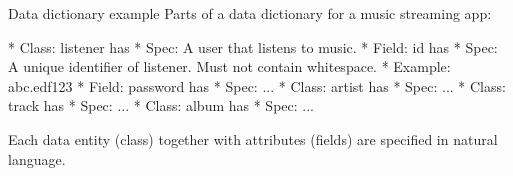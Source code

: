 \begin{Slide}{Data dictionary example}
Parts of a data dictionary for a music streaming app:
\begin{Code}[language=reqt]
* Class: listener has
  * Spec: A user that listens to music.
  * Field: id has
    * Spec: A unique identifier of listener. Must not contain whitespace.
    * Example: abc.edf123
  * Field: password has
    * Spec: ...
* Class: artist has
  * Spec: ...
* Class: track has
  * Spec: ...
* Class: album has
  * Spec: ...
\end{Code}
Each data entity (class) together with attributes (fields) are specified in natural language.
\end{Slide}
